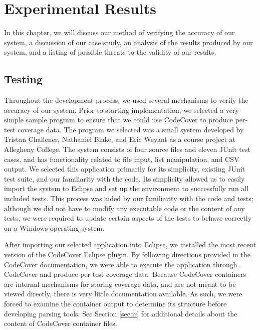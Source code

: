 %
%
%
\chapter{Experimental Results}\label{ch:results}

In this chapter, we will discuss our method of verifying the accuracy of our system,
a discussion of our case study, an analysis of the results produced by our system,
and a listing of possible threats to the validity of our results.

\section{Testing}\label{sec:test}

Throughout the development process, we used several mechanisms to verify the accuracy
of our system.  Prior to starting implementation, we selected a very simple sample
program to ensure that we could use CodeCover to produce per-test coverage data.  The
program we selected was a small system developed by Tristan Challener, Nathaniel Blake,
and Eric Weyant as a course project at Allegheny College.  The system consists of four
source files and eleven JUnit test cases, and has functionality related to file input,
list manipulation, and CSV output.  We selected this application primarily for its
simplicity, existing JUnit test suite, and our familiarity with the code.  Its
simplicity allowed us to easily import the system to Eclipse and set up the environment
to successfully run all included tests.  This process was aided by our familiarity with
the code and tests; although we did not have to modify any executable code or the 
content of any tests, we were required to update certain aspects of the tests to behave
correctly on a Windows operating system.

After importing our selected application into Eclipse, we installed the most recent version
of the CodeCover Eclipse plugin.  By following directions provided in the CodeCover documentation,
we were able to execute the application through CodeCover and produce per-test coverage data.
Because CodeCover containers are internal mechanisms for storing coverage data, and are not
meant to be viewed directly, there is very little documentation available.  As such, we were 
forced to examine the container output to determine its structure before developing parsing
tools.  See Section \ref{sec:ir} for additional details about the content of CodeCover
container files.

